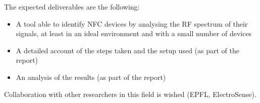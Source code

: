 The expected deliverables are the following:

\begin{itemize}
  \item A tool able to identify NFC devices by analysing the RF spectrum of their signals, at least in an ideal environment and with a small number of devices
  \item A detailed account of the steps taken and the setup used (as part of the report)
  \item An analysis of the results (as part of the report)
\end{itemize}

Collaboration with other researchers in this field is wished (EPFL, ElectroSense).
